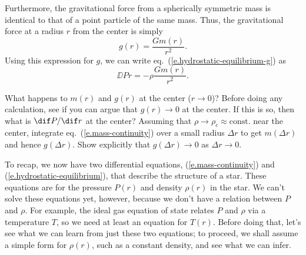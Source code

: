 Furthermore, the gravitational force from a spherically symmetric mass is identical to that of a point particle of the same mass. Thus, the gravitational force at a radius $r$ from the center is simply
\[ g(r) = \frac{Gm(r)}{r^{2}}. \]
Using this expression for $g$, we can write eq.~(\ref{e.hydrostatic-equilibrium-g}) as
\begin{equation}\label{e.hydrostatic-equilibrium}
        \DD{P}{r} = -\rho \frac{Gm(r)}{r^{2}}.
\end{equation}

\begin{exercisebox}
What happens to $m(r)$ and $g(r)$ at the center ($r\to0$)? Before doing any calculation, see if you can argue that $g(r)\to0$ at the center. If this is so, then what is $\dif P/\dif r$ at the center? Assuming that $\rho\to\rho_{c}\approx\mathrm{const.}$ near the center, integrate eq.~(\ref{e.mass-continuity}) over a small radius $\Delta r$ to get $m(\Delta r)$ and hence $g(\Delta r)$. Show explicitly that $g(\Delta r)\to 0$ as $\Delta r\to0$.
\end{exercisebox}

To recap, we now have two differential equations, (\ref{e.mass-continuity}) and (\ref{e.hydrostatic-equilibrium}), that describe the structure of a star. These equations are for the pressure $P(r)$ and density $\rho(r)$ in the star. We can't solve these equations yet, however, because we don't have a relation between $P$ and $\rho$. For example, the ideal gas equation of state relates $P$ and $\rho$ via a temperature $T$, so we need at least an equation for $T(r)$. Before doing that, let's see what we can learn from just these two equations; to proceed, we shall assume a simple form for $\rho(r)$, such as a constant density, and see what we can infer.

